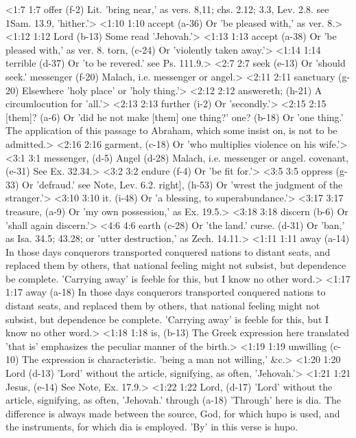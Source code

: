 <1:7 1:7  offer (f-2)  Lit. 'bring near,' as vers. 8,11; chs. 2.12; 3.3, Lev. 2.8.  see 1Sam. 13.9, 'hither.'>
<1:10 1:10  accept (a-36)  Or 'be pleased with,' as ver. 8.>
<1:12 1:12  Lord (b-13)  Some read 'Jehovah.'>
<1:13 1:13  accept (a-38)  Or 'be pleased with,' as ver. 8.
  torn, (c-24)  Or 'violently taken away.'>
<1:14 1:14  terrible (d-37)  Or 'to be revered.' see Ps. 111.9.>
<2:7 2:7  seek (e-13)  Or 'should seek.'
  messenger (f-20)  Malach, i.e. messenger or angel.>
<2:11 2:11  sanctuary (g-20)  Elsewhere 'holy place' or 'holy thing.'>
<2:12 2:12  answereth; (h-21)  A circumlocution for 'all.'>
<2:13 2:13  further (i-2)  Or 'secondly.'>
<2:15 2:15  [them]? (a-6)  Or 'did he not make [them] one thing?'
  one? (b-18)  Or 'one thing.' The application of this passage to Abraham,  which some insist on, is not to be admitted.>
<2:16 2:16  garment, (c-18)  Or 'who multiplies violence on his wife.'>
<3:1 3:1  messenger, (d-5)  Angel (d-28)
  Malach, i.e. messenger or angel.
  covenant, (e-31)  See Ex. 32.34.>
<3:2 3:2  endure (f-4)  Or 'be fit for.'>
<3:5 3:5  oppress (g-33)  Or 'defraud.' see Note, Lev. 6.2.
  right], (h-53)  Or 'wrest the judgment of the stranger.'>
<3:10 3:10  it. (i-48)  Or 'a blessing, to superabundance.'>
<3:17 3:17  treasure, (a-9)  Or 'my own possession,' as Ex. 19.5.>
<3:18 3:18  discern (b-6)  Or 'shall again discern.'>
<4:6 4:6  earth (c-28)  Or 'the land.'
  curse. (d-31)  Or 'ban,' as Isa. 34.5; 43.28; or 'utter destruction,' as  Zech. 14.11.>
<1:11 1:11  away (a-14) In those days conquerors transported conquered nations to distant seats, and replaced them by others, that national feeling might not subsist, but dependence be complete. 'Carrying away' is feeble for this, but I know no other word.>
<1:17 1:17  away (a-18)  In those days conquerors transported conquered nations to  distant seats, and replaced them by others, that national  feeling might not subsist, but dependence be complete.  'Carrying away' is feeble for this, but I know no other word.>
<1:18 1:18  is, (b-13)  The Greek expression here translated 'that is' emphasizes the  peculiar manner of the birth.>
<1:19 1:19  unwilling (c-10)  The expression is characteristic. 'being a man not willing,'  &c.>
<1:20 1:20  Lord (d-13)  'Lord' without the article, signifying, as often, 'Jehovah.'>
<1:21 1:21  Jesus, (e-14)  See Note, Ex. 17.9.>
<1:22 1:22  Lord, (d-17)  'Lord' without the article, signifying, as often, 'Jehovah.'
  through (a-18)  'Through' here is dia. The difference is always made  between the source, God, for which hupo is used, and the  instruments, for which dia is employed. 'By' in this verse is  hupo.
